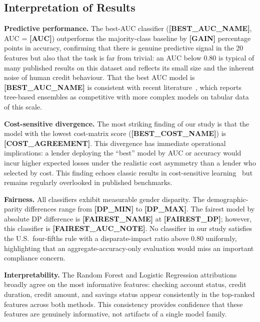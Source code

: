 \documentclass[conference]{IEEEtran}
\begin{document}
\subsection{Interpretation of Results}

\textbf{Predictive performance.} The best-AUC classifier (\textbf{[BEST_AUC_NAME]}, AUC = \textbf{[AUC]}) outperforms the majority-class baseline by \textbf{[GAIN]} percentage points in accuracy, confirming that there is genuine predictive signal in the 20 features but also that the task is far from trivial: an AUC below 0.80 is typical of many published results on this dataset and reflects its small size and the inherent noise of human credit behaviour. That the best AUC model is \textbf{[BEST_AUC_NAME]} is consistent with recent literature~\cite{creditworthiness2025}, which reports tree-based ensembles as competitive with more complex models on tabular data of this scale.

\textbf{Cost-sensitive divergence.} The most striking finding of our study is that the model with the lowest cost-matrix score (\textbf{[BEST_COST_NAME]}) is \textbf{[COST_AGREEMENT]}. This divergence has immediate operational implications: a lender deploying the ``best'' model by AUC or accuracy would incur higher expected losses under the realistic cost asymmetry than a lender who selected by cost. This finding echoes classic results in cost-sensitive learning~\cite{elkan2001} but remains regularly overlooked in published benchmarks.

\textbf{Fairness.} All classifiers exhibit measurable gender disparity. The demographic-parity differences range from \textbf{[DP_MIN]} to \textbf{[DP_MAX]}. The fairest model by absolute DP difference is \textbf{[FAIREST_NAME]} at \textbf{[FAIREST_DP]}; however, this classifier is \textbf{[FAIREST_AUC_NOTE]}. No classifier in our study satisfies the U.S.\ four-fifths rule with a disparate-impact ratio above 0.80 uniformly, highlighting that an aggregate-accuracy-only evaluation would miss an important compliance concern.

\textbf{Interpretability.} The Random Forest and Logistic Regression attributions broadly agree on the most informative features: checking account status, credit duration, credit amount, and savings status appear consistently in the top-ranked features across both methods. This consistency provides confidence that these features are genuinely informative, not artifacts of a single model family.
\end{document}
